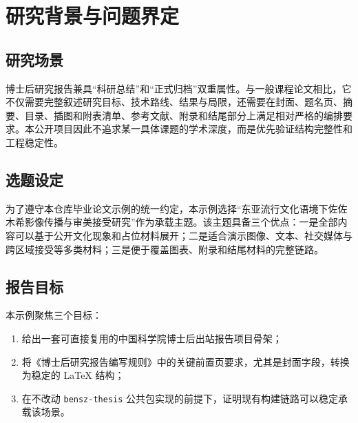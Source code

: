 \chapter{研究背景与问题界定}

\section{研究场景}

博士后研究报告兼具“科研总结”和“正式归档”双重属性。与一般课程论文相比，它不仅需要完整叙述研究目标、技术路线、结果与局限，还需要在封面、题名页、摘要、目录、插图和附表清单、参考文献、附录和结尾部分上满足相对严格的编排要求。本公开项目因此不追求某一具体课题的学术深度，而是优先验证结构完整性和工程稳定性。

\section{选题设定}

为了遵守本仓库毕业论文示例的统一约定，本示例选择“东亚流行文化语境下佐佐木希影像传播与审美接受研究”作为承载主题。该主题具备三个优点：一是全部内容可以基于公开文化现象和占位材料展开；二是适合演示图像、文本、社交媒体与跨区域接受等多类材料；三是便于覆盖图表、附录和结尾材料的完整链路。

\section{报告目标}

本示例聚焦三个目标：

\begin{enumerate}
  \item 给出一套可直接复用的中国科学院博士后出站报告项目骨架；
  \item 将《博士后研究报告编写规则》中的关键前置页要求，尤其是封面字段，转换为稳定的 LaTeX 结构；
  \item 在不改动 \texttt{bensz-thesis} 公共包实现的前提下，证明现有构建链路可以稳定承载该场景。
\end{enumerate}
